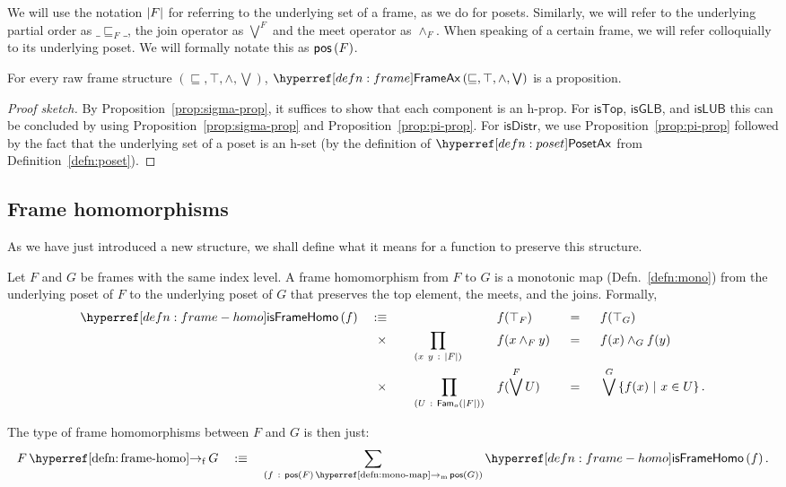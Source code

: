 We will use the notation $\left| F \right|$ for referring to the underlying set of a frame, as we
do for posets. Similarly, we will refer to the underlying partial order as $\_\sqsubseteq_F\_$, the
join operator as $\bigvee^F$ and the meet operator as $\wedge_F$. When speaking of a certain frame,
we will refer colloquially to its underlying poset. We will formally notate this as
$\mathsf{pos}\left(F\right)$.

\begin{prop}
  For every raw frame structure $(\sqsubseteq, \top, \wedge, \bigvee)$, $\frameax{\sqsubseteq, \top, \wedge, \bigvee}$ is a proposition.
\end{prop}
\begin{proof}[Proof sketch]
  By Proposition~\ref{prop:sigma-prop}, it suffices to show that each component is an
  h-prop. For $\mathsf{isTop}$, $\mathsf{isGLB}$, and $\mathsf{isLUB}$ this can be
  concluded by using Proposition~\ref{prop:sigma-prop} and Proposition~\ref{prop:pi-prop}.
  For $\mathsf{isDistr}$, we use Proposition~\ref{prop:pi-prop} followed by the fact that
  the underlying set of a poset is an h-set (by the definition of $\posetaxnm{}$ from
  Definition~\ref{defn:poset}).
\end{proof}

\subsection{Frame homomorphisms}

As we have just introduced a new structure, we shall define what it means for a function
to preserve this structure.

\begin{defn}\label{defn:frame-homo}
  Let $F$ and $G$ be frames with the same index level. A frame homomorphism from $F$ to
  $G$ is a monotonic map (Defn.~\ref{defn:mono}) from the underlying poset of $F$ to the
  underlying poset of $G$ that preserves the top element, the meets, and the joins.
  Formally,
  \begin{alignat*}{5}
    \isframehomo{f} \quad&\is\quad && &&f(\top_F) &&\idnm{} &&f(\top_G) \\
      &\hspace{0.55em}\times\quad  &&\pity{x~y}{\abs{F}}{&&f(x \wedge_F y) &&\idnm{} &&f(x) \wedge_G f(y)} \\
      &\hspace{0.55em}\times\quad  &&\pity{U}{\sub{o}{\abs{F}}}{&&f(\bigvee^F U) &&\idnm{} &&\bigvee^G \setof{ f(x) ~|~ x \in U }}.
  \end{alignat*}

  The type of frame homomorphisms between $F$ and $G$ is then just:
  \begin{equation*}
    \framehomo{F}{G} \quad\is\quad \sigmaty{f}{\mono{\posof{F}}{\posof{G}}}{\isframehomo{f}}.
  \end{equation*}
\end{defn}


